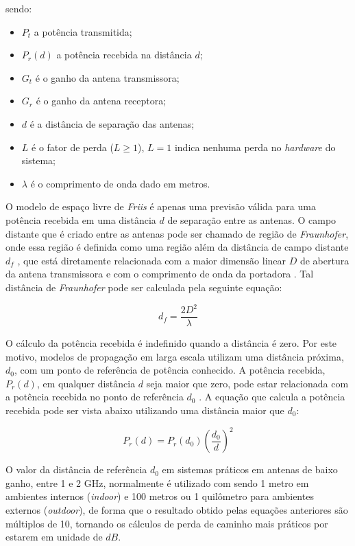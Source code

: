 \documentclass[
	12pt,				%
	twoside,			%
	a4paper,			%
	english,			%
	french,				%
	spanish,			%
	brazil				%
	]{abntex2}
\begin{document}
sendo:

\begin{itemize}
\item
  \(P_{t}\) a potência transmitida;
\item
  \(P_{r}(d)\) a potência recebida na distância \(d\);
\item
  \(G_{t}\) é o ganho da antena transmissora;
\item
  \(G_{r}\) é o ganho da antena receptora;
\item
  \(d\) é a distância de separação das antenas;
\item
  \(L\) é o fator de perda (\(L\geq1\)), \(L = 1\) indica nenhuma perda
  no \emph{hardware} do sistema;
\item
  \(\lambda\) é o comprimento de onda dado em metros.
\end{itemize}

O modelo de espaço livre de \emph{Friis} é apenas uma previsão válida
para uma potência recebida em uma distância \(d\) de separação entre as
antenas. O campo distante que é criado entre as antenas pode ser chamado
de região de \emph{Fraunhofer}, onde essa região é definida como uma
região além da distância de campo distante \(d_{f}\) , que está
diretamente relacionada com a maior dimensão linear \(D\) de abertura da
antena transmissora e com o comprimento de onda da portadora
\cite{RAPPAPORT}. Tal distância de \emph{Fraunhofer} pode ser calculada
pela seguinte equação:

\begin{equation}
    d_{f} =  \frac{2D^{2}}{\lambda}
\end{equation}

O cálculo da potência recebida é indefinido quando a distância é zero.
Por este motivo, modelos de propagação em larga escala utilizam uma
distância próxima, \(d_{0}\), com um ponto de referência de potência
conhecido. A potência recebida, \(P_{r}(d)\), em qualquer distância
\(d\) seja maior que zero, pode estar relacionada com a potência
recebida no ponto de referência \(d_{0}\) \cite{RAPPAPORT}. A equação
que calcula a potência recebida pode ser vista abaixo utilizando uma
distância maior que \(d_{0}\):

\begin{equation}
    P_{r}(d) = P_{r}(d_{0})(\frac{d_{0}}{d})^{2}
\end{equation}

O valor da distância de referência \(d_{0}\) em sistemas práticos em
antenas de baixo ganho, entre 1 e 2 GHz, normalmente é utilizado com
sendo 1 metro em ambientes internos (\emph{indoor}) e 100 metros ou 1
quilômetro para ambientes externos (\emph{outdoor}), de forma que o
resultado obtido pelas equações anteriores são múltiplos de 10, tornando
os cálculos de perda de caminho mais práticos por estarem em unidade de
\(dB\).
\end{document}
